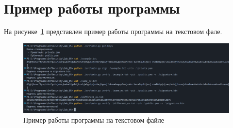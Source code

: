\clearpage

\section{Пример работы программы}

На рисунке~\ref{fig:tex} представлен пример работы программы на текстовом фале.

\begin{figure}[h]
    \centering
    \includegraphics[width=1\linewidth]{images/tex.png}
    \caption{Пример работы программы на текстовом файле}
    \label{fig:tex}
\end{figure}
